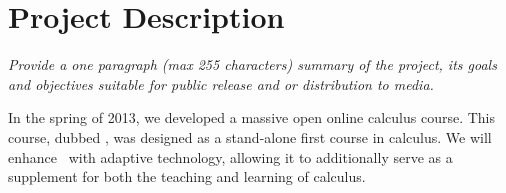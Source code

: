 \section*{Project Description}

\textsl{Provide a one paragraph (max 255 characters) summary of the project,
its goals and objectives suitable for public release and or
distribution to media.}

\vspace{\topsep}

In the spring of 2013, we developed a massive open online calculus
course. This course, dubbed \mooculus, was designed as a stand-alone
first course in calculus.  We will enhance \mooculus\ with adaptive
technology, allowing it to additionally serve as a supplement for both
the teaching and learning of calculus.

